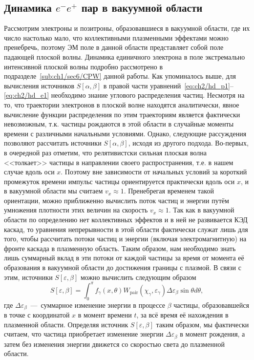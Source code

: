 \subsection{Динамика $e^-e^+$ пар в вакуумной области}
Рассмотрим электроны и позитроны, образовавшиеся в вакуумной области, где их число настолько мало, что коллективными плазменными эффектами можно пренебречь, поэтому ЭМ поле в данной области представляет собой поле падающей плоской волны. 
Динамика единичного электрона в поле экстремально интенсивной плоской волны подробно рассмотрено в подразделе~\ref{sub:ch1/sec6/CPW} данной работы.
Как упоминалось выше, для вычисления источников $S[\alpha, \beta]$ в правой части уравнений~\eqref{eq:ch2/hd_p1}--\eqref{eq:ch2/hd_e1} необходимо знание углового распределения частиц.
Несмотря на то, что траектории электронов в плоской волне находятся аналитически, явное вычисление функции распределения по этим траекториям является фактически невозможным, т.к. частицы рождаются в этой области в случайные моменты времени с различными начальными условиями.
Однако, следующие рассуждения позволяют рассчитать источники $S[\alpha, \beta]$, исходя из другого подхода.
Во-первых, в очередной раз отметим, что релятивистски сильная плоская волна <<толкает>> частицы в направлении своего распространения, т.е. в нашем случае вдоль оси $x$.
Поэтому вне зависимости от начальных условий за короткий промежуток времени импульс частицы ориентируется практически вдоль оси $x$, и в вакуумной области мы считаем $v_x \approx 1$.
Пренебрегая временем такой ориентации, можно приближенно вычислить поток частиц и энергии путём умножения плотности этих величин на скорость $v_x \approx 1$.
Так как в вакуумной области по определению нет коллективных эффектов и в ней не развивается КЭД каскад, то уравнения непрерывности в этой области фактически служат лишь для того, чтобы рассчитать потоки частиц и энергии (включая электромагнитную) на фронте каскада в плазменную область.
Таким образом, нам необходимо знать лишь суммарный вклад в эти потоки от каждой частицы за время от момента её образования в вакуумной области до достижения границы с плазмой.
В связи с этим, источники $S[\varepsilon,\beta]$ можно вычислить следующим образом
\begin{equation}
    S[\varepsilon,\beta] = \int_0^\pi f_\gamma(x, \theta) W_\mathrm{pair}(\chi_\gamma, \varepsilon_\gamma) \Delta\varepsilon_\beta \sin\theta d\theta ,
\end{equation}
где $\Delta\varepsilon_\beta$~---~суммарное изменение энергии в процессе $\beta$ частицы, образовавшейся в точке с координатой $x$ в момент времени $t$, за всё время её нахождения в плазменной области.
Определяя источник $S[\varepsilon,\beta]$ таким образом, мы фактически считаем, что частица приобретает изменение энергии $\Delta\varepsilon_\beta$ в момент рождения, а затем без изменения энергии движется со скоростью света до плазменной области.

